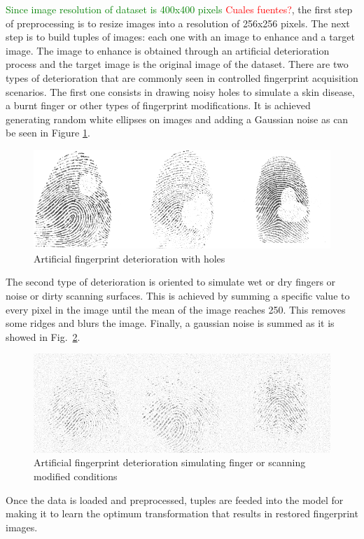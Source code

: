 \documentclass[a4paper,fleqn]{cas-dc}
\begin{document}
\textcolor{green}{Since image resolution of dataset is 400x400 pixels} \textcolor{red}{Cuales fuentes?}, the first step of preprocessing is to resize images into a resolution of 256x256 pixels. The next step is to build tuples of images: each one with an image to enhance and a target image. The image to enhance is obtained through an artificial deterioration process and the target image is the original image of the dataset. There are two types of deterioration that are commonly seen in controlled fingerprint acquisition scenarios. The first one consists in drawing noisy holes to simulate a skin disease, a burnt finger or other types of fingerprint modifications. It is achieved generating random white ellipses on images and adding a Gaussian noise as can be seen in Figure \ref{fig2}.
\begin{figure}[htbp]
\centerline{\includegraphics[scale=0.3]{figs/deterioration_1.png}}
\caption{Artificial fingerprint deterioration with holes}
\label{fig2}
\end{figure}
The second type of deterioration is oriented to simulate wet or dry fingers or noise or dirty scanning surfaces. This is achieved by summing a specific value to every pixel in the image until the mean of the image reaches 250. This removes some ridges and blurs the image. Finally, a gaussian noise is summed as it is showed in Fig.~\ref{fig3}.
\begin{figure}[ht]
\centerline{\includegraphics[scale=0.32]{figs/deterioration_2.png}}
\caption{Artificial fingerprint deterioration simulating finger or scanning modified conditions}
\label{fig3}
\end{figure}
Once the data is loaded and preprocessed, tuples are feeded into the model for making it to learn the optimum transformation that results in restored fingerprint images.
\end{document}
